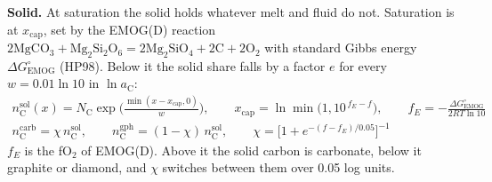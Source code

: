 \documentclass[11pt]{article}
\newcommand{\aC}{a_{\mathrm{C}}}
\begin{document}
{\textbf{Solid.} At saturation the solid holds whatever melt and fluid do not. Saturation is at $x_{\mathrm{cap}}$, set by the EMOG(D) reaction $\mathrm{2MgCO_3+Mg_2Si_2O_6=2Mg_2SiO_4+2C+2O_2}$ with standard Gibbs energy $\Delta G^\circ_{\mathrm{EMOG}}$ (HP98). Below it the solid share falls by a factor $e$ for every $w=0.01\ln10$ in $\ln\aC$:
\begin{gather}
  n_{\mathrm C}^{\mathrm{sol}}(x)=N_{\mathrm C}\exp\!\Big(\frac{\min(x-x_{\mathrm{cap}},0)}{w}\Big),\qquad
  x_{\mathrm{cap}}=\ln\min\big(1,10^{\,f_E-f}\big),\qquad f_E=-\frac{\Delta G^\circ_{\mathrm{EMOG}}}{2RT\ln10}\nonumber\\
  n_{\mathrm{C}}^{\mathrm{carb}}=\chi\,n_{\mathrm C}^{\mathrm{sol}},\qquad n_{\mathrm{C}}^{\mathrm{gph}}=(1-\chi)\,n_{\mathrm C}^{\mathrm{sol}},\qquad
  \chi=\Big[1+e^{-(f-f_E)/0.05}\Big]^{-1}
\end{gather}
$f_E$ is the fO$_2$ of EMOG(D). Above it the solid carbon is carbonate, below it graphite or diamond, and $\chi$ switches between them over 0.05 log units.
}

\vspace*{\fill}
\clearpage
\end{document}
